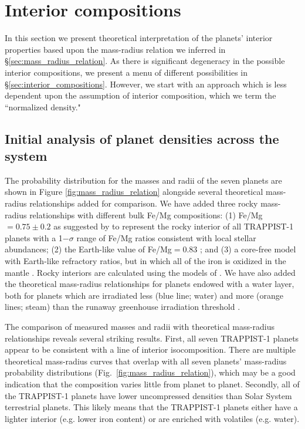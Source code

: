 \documentclass[twocolumn]{aastex63}
\begin{document}
\section{Interior compositions}
\label{sec:theoretical_interpretation}

In this section we present theoretical interpretation of the planets'
interior properties based upon the mass-radius relation we inferred in \S \ref{sec:mass_radius_relation}.  As there is significant degeneracy in the possible interior compositions, we present a menu of different possibilities in \S \ref{sec:interior_compositions}.  However, we start with an approach which is less dependent upon the assumption of interior composition, which we term the ``normalized density."

\subsection{Initial analysis of planet densities across the system}

The probability distribution for the masses and radii of the seven planets are shown in Figure \ref{fig:mass_radius_relation} alongside several theoretical mass-radius relationships added for comparison.
We have added three rocky mass-radius relationships with different bulk Fe/Mg compositions:  (1) Fe/Mg$ =0.75{\pm} 0.2$ as suggested by \citet{Unterborn2018a} to represent the rocky interior of all TRAPPIST-1 planets with a 1$-\sigma$ range of Fe/Mg ratios consistent with local stellar abundances;  (2) the Earth-like value of Fe/Mg$ = 0.83$ \citep{Lodders2009}; and (3) a core-free model with Earth-like refractory ratios, but in which all of the iron is oxidized in the mantle \citep{ElkinsTanton2008}. Rocky interiors are calculated using the models of \citet{Dorn2016}. We have also added the theoretical mass-radius relationships for planets endowed with a water layer, both for planets which are irradiated less (blue line; water) and more (orange lines; steam) than the runaway greenhouse irradiation threshold \citep{Turbet2020}.

The comparison of measured masses and radii with theoretical mass-radius relationships reveals several striking results. First, all seven TRAPPIST-1 planets appear to be consistent with a line of interior isocomposition. There are multiple theoretical mass-radius curves that overlap with all seven planets' mass-radius probability distributions (Fig.\ \ref{fig:mass_radius_relation}), which may be a good indication that the composition varies little from planet to planet. Secondly, all of the TRAPPIST-1 planets have lower uncompressed densities than Solar System terrestrial planets. This likely means that the TRAPPIST-1 planets either have a lighter interior (e.g. lower iron content) or are enriched with volatiles (e.g. water).
\end{document}
